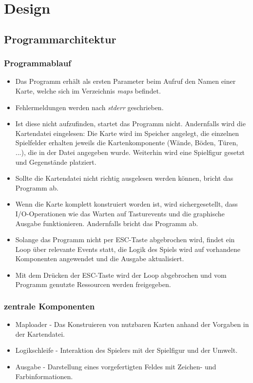 \documentclass[11pt,a4paper,notitlepage]{report}
\begin{document}
	\section*{Design}
		\subsection*{Programmarchitektur}
			\subsubsection*{Programmablauf}
			\begin{itemize}
				\item Das Programm erhält als ersten Parameter beim Aufruf den Namen einer Karte, welche sich im Verzeichnis \textit{maps} befindet.
				\item Fehlermeldungen werden nach \textit{stderr} geschrieben.
				\item Ist diese nicht aufzufinden, startet das Programm nicht. Andernfalls wird die Kartendatei eingelesen: Die Karte wird im Speicher angelegt, die einzelnen Spielfelder erhalten jeweils die Kartenkomponente (Wände, Böden, Türen, ...), die in der Datei angegeben wurde. Weiterhin wird eine Spielfigur gesetzt und Gegenstände platziert.
				\item Sollte die Kartendatei nicht richtig ausgelesen werden können, bricht das Programm ab.
				\item Wenn die Karte komplett konstruiert worden ist, wird sichergesetellt, dass I/O-Operationen wie das Warten auf Tasturevents und die graphische Ausgabe funktionieren. Andernfalls bricht das Programm ab.
				\item Solange das Programm nicht per ESC-Taste abgebrochen wird, findet ein Loop über  relevante Events statt, die Logik des Spiels wird auf vorhandene Komponenten angewendet und die Ausgabe aktualisiert.
				\item Mit dem Drücken der ESC-Taste wird der Loop abgebrochen und vom Programm genutzte Ressourcen werden freigegeben.
			\end{itemize}
			
			\subsubsection*{zentrale Komponenten}
			\begin{itemize}
				\item Maploader - Das Konstruieren von nutzbaren Karten anhand der Vorgaben in der Kartendatei.
				\item Logikschleife - Interaktion des Spielers mit der Spielfigur und der Umwelt.
				\item Ausgabe - Darstellung eines vorgefertigten Feldes mit Zeichen- und Farbinformationen.
			\end{itemize}
			
\end{document}
